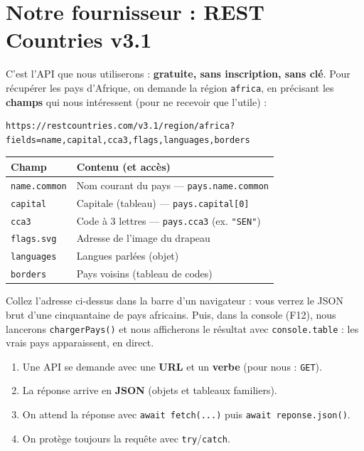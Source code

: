 \documentclass[11pt,a4paper]{article}
\newcommand{\code}[1]{\texttt{#1}}
\begin{document}
\section{Notre fournisseur : REST Countries v3.1}

C'est l'API que nous utiliserons : \textbf{gratuite, sans inscription, sans clé}. Pour récupérer les pays d'Afrique, on demande la région \code{africa}, en précisant les \textbf{champs} qui nous intéressent (pour ne recevoir que l'utile) :

\begin{lstlisting}[style=html]
https://restcountries.com/v3.1/region/africa?fields=name,capital,cca3,flags,languages,borders
\end{lstlisting}

\begin{center}
\begin{tabular}{l l}
\toprule
\textbf{Champ} & \textbf{Contenu (et accès)} \\
\midrule
\code{name.common}  & Nom courant du pays --- \code{pays.name.common} \\
\code{capital}      & Capitale (tableau) --- \code{pays.capital[0]} \\
\code{cca3}         & Code à 3 lettres --- \code{pays.cca3} (ex. \code{"SEN"}) \\
\code{flags.svg}    & Adresse de l'image du drapeau \\
\code{languages}    & Langues parlées (objet) \\
\code{borders}      & Pays voisins (tableau de codes) \\
\bottomrule
\end{tabular}
\end{center}

\begin{infobox}
Collez l'adresse ci-dessus dans la barre d'un navigateur : vous verrez le JSON brut d'une cinquantaine de pays africains. Puis, dans la console (F12), nous lancerons \code{chargerPays()} et nous afficherons le résultat avec \code{console.table} : les vrais pays apparaissent, en direct.
\end{infobox}

\begin{retenirbox}
\begin{enumerate}[leftmargin=*,noitemsep]
  \item Une API se demande avec une \textbf{URL} et un \textbf{verbe} (pour nous : \code{GET}).
  \item La réponse arrive en \textbf{JSON} (objets et tableaux familiers).
  \item On attend la réponse avec \code{await fetch(...)} puis \code{await reponse.json()}.
  \item On protège toujours la requête avec \code{try}/\code{catch}.
\end{enumerate}
\end{retenirbox}
\end{document}
